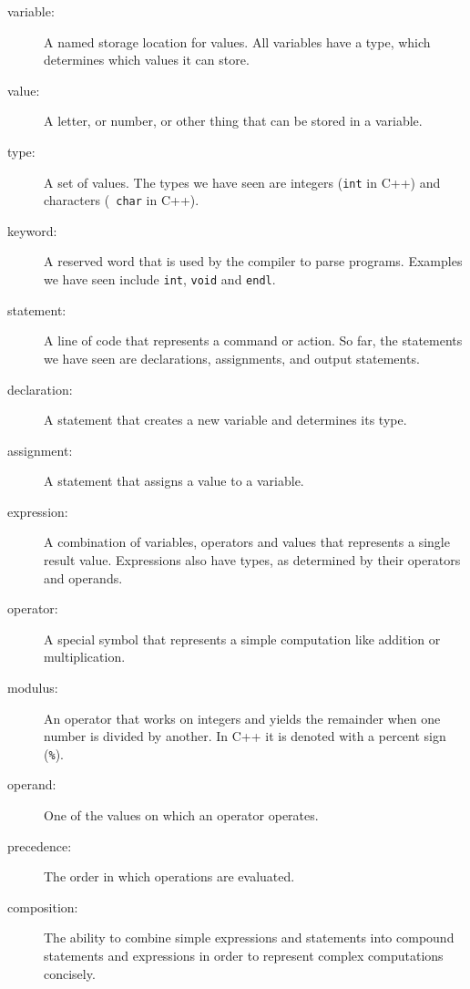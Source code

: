 \begin{description}

\item[variable:] A named storage location for values.  All
variables have a type, which determines which values it can
store.

\item[value:] A letter, or number, or other thing that can be
stored in a variable.  

\item[type:] A set of values.  The types
we have seen are integers ({\tt int} in C++) and characters ({\tt
char} in C++).

\item[keyword:]  A reserved word that is used by the compiler
to parse programs.  Examples we have seen include {\tt int},
{\tt void} and {\tt endl}.

\item[statement:] A line of code that represents a command or
action.  So far, the statements we have seen are declarations,
assignments, and output statements.

\item[declaration:] A statement that creates a new variable and
determines its type.

\item[assignment:] A statement that assigns a value to a variable.

\item[expression:] A combination of variables, operators and
values that represents a single result value.  Expressions also
have types, as determined by their operators and operands.

\item[operator:] A special symbol that represents a simple
computation like addition or multiplication.

\item[modulus:]  An operator that works on integers and yields
the remainder when one number is divided by another.  In C++
it is denoted with a percent sign ({\tt \%}).

\item[operand:] One of the values on which an operator operates. 

\item[precedence:] The order in which operations are evaluated.

\item[composition:] The ability to combine simple
expressions and statements into compound statements and expressions
in order to represent complex computations concisely.


\end{description}


